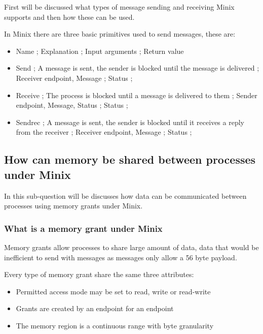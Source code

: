 First will be discussed what types of message sending and receiving
Minix supports and then how these can be used.

In Minix there are three basic primitives used to send messages, these
are:

\begin{itemize}
\tightlist
\item
  Name ; Explanation ; Input arguments ; Return value
\item
  Send ; A message is sent, the sender is blocked until the message is
  delivered ; Receiver endpoint, Message ; Status ;
\item
  Receive ; The process is blocked until a message is delivered to them
  ; Sender endpoint, Message, Status ; Status ;
\item
  Sendrec ; A message is sent, the sender is blocked until it receives a
  reply from the receiver ; Receiver endpoint, Message ; Status ;
\end{itemize}

\hypertarget{how-can-memory-be-shared-between-processes-under-minix}{%
\subsection{How can memory be shared between processes under
Minix}\label{how-can-memory-be-shared-between-processes-under-minix}}

In this sub-question will be discusses how data can be communicated
between processes using memory grants under Minix.

\hypertarget{what-is-a-memory-grant-under-minix}{%
\subsubsection{What is a memory grant under
Minix}\label{what-is-a-memory-grant-under-minix}}

Memory grants allow processes to share large amount of data, data that
would be inefficient to send with messages as messages only allow a 56
byte payload.

Every type of memory grant share the same three attributes:

\begin{itemize}
\tightlist
\item
  Permitted access mode may be set to read, write or read-write
\item
  Grants are created by an endpoint for an endpoint
\item
  The memory region is a continuous range with byte granularity
\end{itemize}

